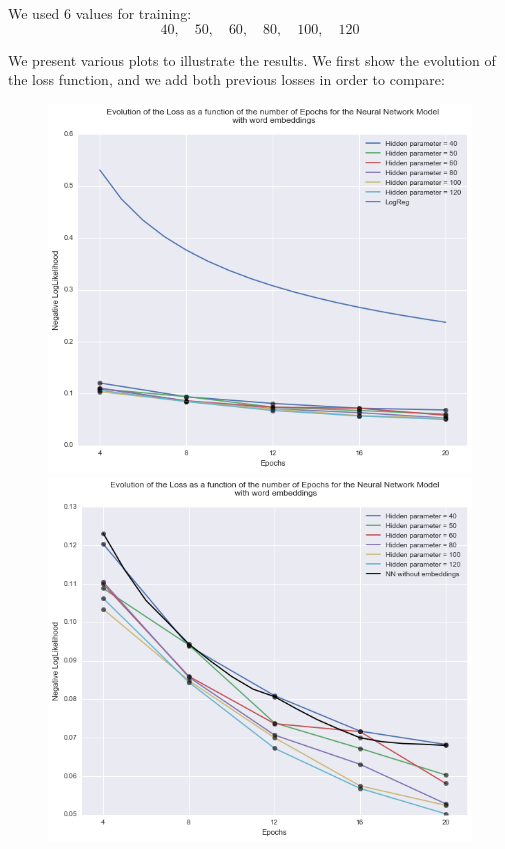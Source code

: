 \documentclass[11pt]{article}
\begin{document}
\noindent We used 6 values for training: $$40, \quad 50, \quad 60, \quad 80, \quad 100, \quad 120$$

\noindent We present various plots to illustrate the results. We first show the evolution of the loss function, and we add both previous losses in order to compare:

\newpage
\begin{figure}[H]
\centering
\begin{minipage}{.4\textwidth}
  \centering
  \includegraphics[width=1.2\linewidth]{compa}
\end{minipage} 
\hfill
\begin{minipage}{.4\textwidth}
  \centering
  \includegraphics[width=1.2\linewidth]{nn_embed}
\end{minipage}
\end{figure}
\end{document}
